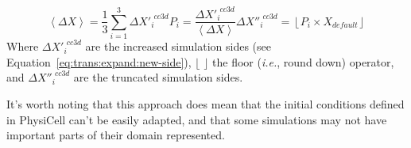 \begin{subequations}\label{eq:trans:truncate}
    \begin{equation}\label{eq:trans:truncate:avg}
        \left<\Delta X\right> = \frac{1}{3} \sum_{i=1}^{3} \Delta X'^{\,\,cc3d}_i
    \end{equation}
    \begin{equation}\label{eq:trans:truncate:prop}
        P_i = \frac{\Delta X'^{\,\,cc3d}_i}{\left<\Delta X\right>}
    \end{equation}
    \begin{equation}\label{eq:trans:truncate:new-side}
        \Delta X''^{\,\,cc3d}_i = \left\lfloor P_i \times X_{default} \right\rfloor
    \end{equation}
\end{subequations}
\noindent Where $\Delta X'^{\,\,cc3d}_i$ are the increased simulation sides (see Equation~\ref{eq:trans:expand:new-side}), $\lfloor\,\,\rfloor$ the floor (\textit{i.e.}, round down) operator, and $\Delta X''^{\,\,cc3d}_i$ are the truncated simulation sides. 

It's worth noting that this approach does mean that the initial conditions defined in PhysiCell can't be easily adapted, and that some simulations may not have important parts of their domain represented.

